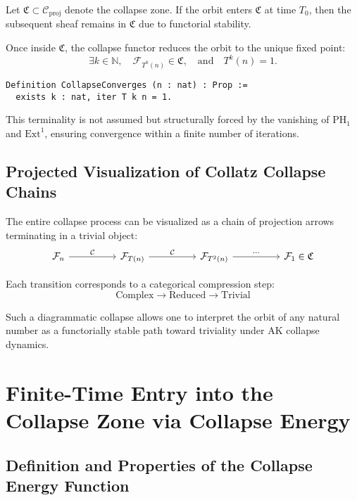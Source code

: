 \documentclass[11pt]{article}
\begin{document}
Let \( \mathfrak{C} \subset \mathcal{C}_{\mathrm{proj}} \) denote the collapse zone. If the orbit enters \( \mathfrak{C} \) at time \( T_0 \), then the subsequent sheaf remains in \( \mathfrak{C} \) due to functorial stability.

Once inside \( \mathfrak{C} \), the collapse functor reduces the orbit to the unique fixed point:
\[
\exists k \in \mathbb{N}, \quad \mathcal{F}_{T^k(n)} \in \mathfrak{C}, \quad \text{and} \quad T^k(n) = 1.
\]

\begin{lstlisting}[language=Coq]
Definition CollapseConverges (n : nat) : Prop :=
  exists k : nat, iter T k n = 1.
\end{lstlisting}

This terminality is not assumed but structurally forced by the vanishing of \( \mathrm{PH}_1 \) and \( \mathrm{Ext}^1 \), ensuring convergence within a finite number of iterations.

\subsection{Projected Visualization of Collatz Collapse Chains}

The entire collapse process can be visualized as a chain of projection arrows terminating in a trivial object:
\[
\begin{tikzcd}[column sep=huge]
\mathcal{F}_n \arrow[r, "\mathcal{C}"] & 
\mathcal{F}_{T(n)} \arrow[r, "\mathcal{C}"] & 
\mathcal{F}_{T^2(n)} \arrow[r, "\cdots"] & 
\mathcal{F}_1 \in \mathfrak{C}
\end{tikzcd}
\]

Each transition corresponds to a categorical compression step:
\[
\text{Complex} \to \text{Reduced} \to \text{Trivial}
\]

Such a diagrammatic collapse allows one to interpret the orbit of any natural number as a functorially stable path toward triviality under AK collapse dynamics.



\section{Finite-Time Entry into the Collapse Zone via Collapse Energy}

\subsection{Definition and Properties of the Collapse Energy Function}
\end{document}
